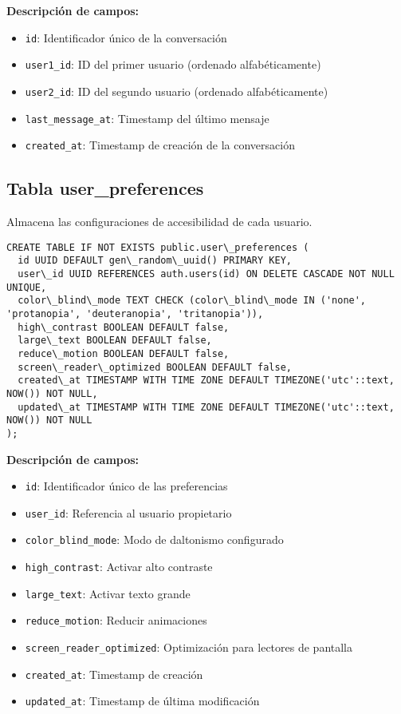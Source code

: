 \documentclass[12pt,a4paper]{article}
\begin{document}
\textbf{Descripción de campos:}
\begin{itemize}
    \item \texttt{id}: Identificador único de la conversación
    \item \texttt{user1\_id}: ID del primer usuario (ordenado alfabéticamente)
    \item \texttt{user2\_id}: ID del segundo usuario (ordenado alfabéticamente)
    \item \texttt{last\_message\_at}: Timestamp del último mensaje
    \item \texttt{created\_at}: Timestamp de creación de la conversación
\end{itemize}

\subsection{Tabla user\_preferences}

Almacena las configuraciones de accesibilidad de cada usuario.

\begin{lstlisting}[caption=Estructura completa de user\_preferences]
CREATE TABLE IF NOT EXISTS public.user\_preferences (
  id UUID DEFAULT gen\_random\_uuid() PRIMARY KEY,
  user\_id UUID REFERENCES auth.users(id) ON DELETE CASCADE NOT NULL UNIQUE,
  color\_blind\_mode TEXT CHECK (color\_blind\_mode IN ('none', 'protanopia', 'deuteranopia', 'tritanopia')),
  high\_contrast BOOLEAN DEFAULT false,
  large\_text BOOLEAN DEFAULT false,
  reduce\_motion BOOLEAN DEFAULT false,
  screen\_reader\_optimized BOOLEAN DEFAULT false,
  created\_at TIMESTAMP WITH TIME ZONE DEFAULT TIMEZONE('utc'::text, NOW()) NOT NULL,
  updated\_at TIMESTAMP WITH TIME ZONE DEFAULT TIMEZONE('utc'::text, NOW()) NOT NULL
);
\end{lstlisting}

\textbf{Descripción de campos:}
\begin{itemize}
    \item \texttt{id}: Identificador único de las preferencias
    \item \texttt{user\_id}: Referencia al usuario propietario
    \item \texttt{color\_blind\_mode}: Modo de daltonismo configurado
    \item \texttt{high\_contrast}: Activar alto contraste
    \item \texttt{large\_text}: Activar texto grande
    \item \texttt{reduce\_motion}: Reducir animaciones
    \item \texttt{screen\_reader\_optimized}: Optimización para lectores de pantalla
    \item \texttt{created\_at}: Timestamp de creación
    \item \texttt{updated\_at}: Timestamp de última modificación
\end{itemize}
\end{document}
